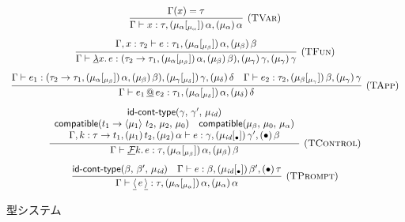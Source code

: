 \documentclass[japanese,draft]{jssst_ppl} %
\begin{document}
\begin{figure}[h]
\[
\begin{array}{c}
\infer[\TVar]
      {\JudgeTrail{\Gamma}{x}{\tau}{\TrailsType{\alpha}{\alpha}}
                                   {\TrailType{\alpha}}}
      {\Gamma(x)=\tau}
\\[3mm]
\infer[\TFun]
      {\JudgeTrail{\Gamma}{\DLam{x}{e}}
                  {\ArrowTrailP{\tau_2}{\tau_1}
                               {\TrailsType{\alpha}{\beta}}
                               {\TrailType{\beta}}}
                  {\TrailType{\gamma}}
                  {\TrailType{\gamma}}}
      {\JudgeTrail{\Gamma,x:\tau_2}{e}{\tau_1}
                  {\TrailsType{\alpha}{\beta}}
                  {\TrailType{\beta}}}
\\[3mm]
\infer[\TApp]
      {\JudgeTrail{\Gamma}{\DApp{e_1}{e_2}}
                  {\tau_1}{\TrailsType{\alpha}{\delta}}{\TrailType{\delta}}}
      {\JudgeTrail{\Gamma}{e_1}
                  {\ArrowTrailP{\tau_2}{\tau_1}{\TrailsType{\alpha}{\beta}}
                                               {\TrailType{\beta}}}
                  {\TrailsType{\gamma}{\delta}}
                  {\TrailType{\delta}}
      &\JudgeTrail{\Gamma}{e_2}{\tau_2}{\TrailsType{\beta}{\gamma}}{\TrailType{\gamma}}}
\\[3mm]
\infer[\TControl]
      {\JudgeTrail{\Gamma}{\DControl{k}{e}}{\tau}
                  {\TrailsType{\alpha}{\beta}}
                  {\TrailType{\beta}}}
      {\begin{array}{c}
       \IsIdTrail{\gamma}{\gamma'}{\MuId}\\
       \Compatible{\Trail{t_1}{t_2}{\mu_1}}{\mu_2}{\mu_0}\quad
       \Compatible{\mu_\beta}{\mu_0}{\mu_\alpha}\\
       \JudgeTrail{\Gamma,k:\ArrowTrail{\tau}{t_1}
                              {\TType{\mu_1}{t_2}}
                              {\TType{\mu_2}{\alpha}}}
                  {e}{\gamma}
                  {\TsType{\MuId}{\gamma'}{\Bullet}}
                  {\TType{\Bullet}{\beta}}
       \end{array}}
\\[3mm]
\infer[\TPrompt]
      {\JudgeTrail{\Gamma}{\DReset{e}}{\tau}{\TrailsType{\alpha}{\alpha}}
                                            {\TrailType{\alpha}}}
      {\IsIdTrail{\beta}{\beta'}{\MuId}
      &\JudgeTrail{\Gamma}{e}{\beta}
                  {\TsType{\MuId}{\beta'}{\Bullet}}
                  {\TType{\Bullet}{\tau}}}
\end{array}
\]
\caption{型システム}
\label{TypeSystem}
\end{figure}
\end{document}
